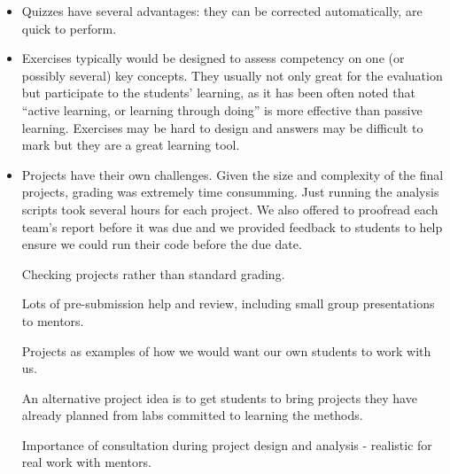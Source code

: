 \begin{itemize}

\item Quizzes have several advantages: they can be corrected automatically, are
quick to perform.

\item %
Exercises typically would be designed to assess competency on one (or
possibly several) key concepts. %
They usually not only great for the evaluation but participate to the students'
learning, as it has been often noted that ``active learning, or learning
through doing'' is more effective than passive learning.
Exercises may be hard to design and answers may be difficult to mark but they
are a great learning tool.

\item Projects have their own challenges.
Given the size and complexity of the final projects, grading was extremely time
consumming.
Just running the analysis scripts took several hours for each project.
We also offered to proofread each team's report before it was due and
we provided feedback to students to help ensure we could run their
code before the due date.

Checking projects rather than standard grading.

Lots of pre-submission help and review, including small group presentations to
mentors.

Projects as examples of how we would want our own students to work with us.

An alternative project idea is to get students to bring projects they have
already planned from labs committed to learning the methods.

Importance of consultation during project design and analysis - realistic for
real work with mentors.



\end{itemize}
